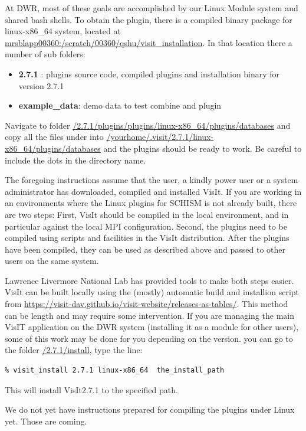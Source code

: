 \documentclass[12pt]{report}
\begin{document}
At DWR, most of these goals are accomplished by our Linux Module system and shared bash shells. 
To obtain the plugin, there is a compiled binary package for linux-x86\_64 system, 
located at \url{mrsblapp00360:/scratch/00360/qshu/visit_installation}. In that location there a number of sub folders:
\begin{itemize}
\item {\bf 2.7.1 }:        plugins source code, compiled plugins and installation binary for version 2.7.1
\item {\bf example\_data}:  demo data to test combine and plugin
\end{itemize}

Navigate to folder \url{/2.7.1/plugins/plugins/linux-x86\_64/plugins/databases} 
and copy all the files under into \url{/yourhome/.visit/2.7.1/linux-x86\_64/plugins/databases} 
and the plugins should be ready to work. Be careful to include the dots in the directory name.

The foregoing instructions assume that the user, a kindly power user 
or a system administrator has downloaded, compiled and installed VisIt.
If you are working in an environments where the Linux plugins for SCHISM is not already built, 
there are two steps: First, VisIt should be compiled in the local environment, and in particular
against the local MPI configuration. Second, the plugins need to be compiled using scripts and facilities in the VisIt distribution. 
After the plugins have been compiled, they can be used as described above and passed to other users on the same system.
 
Lawrence Livermore National Lab has provided tools to make both steps easier. VisIt can be built locally 
using the (mostly) automatic build and installion script from \url{https://visit-dav.github.io/visit-website/releases-as-tables/}. 
This method can be length and may require some intervention.      
If you are managing the main VisIT application on the DWR system (installing it as a module for other users), 
some of this work may be done for you depending on the version.
you can go to the folder \url{/2.7.1/install}, type the line:
\begin{verbatim}
% visit_install 2.7.1 linux-x86_64  the_install_path
\end{verbatim} 
This will install VisIt2.7.1  to the specified path. 

We do not yet have instructions prepared for compiling the plugins under Linux yet. Those are coming.
\end{document}
